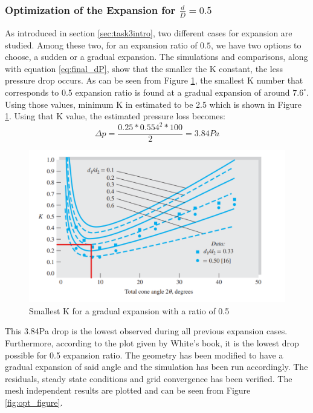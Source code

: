 \subsubsection{Optimization of the Expansion for $\frac{d}{D} = 0.5$}

As introduced in section \ref{sec:task3intro}, two different cases for expansion are studied. Among these two, for an expansion ratio of $0.5$, we have two options to choose, a sudden or a gradual expansion. The simulations and comparisons, along with equation \ref{eq:final_dP}, show that the smaller the K constant, the less pressure drop occurs. As can be seen from Figure \ref{fig:cone_angle}, the smallest K number that corresponds to 0.5 expansion ratio is found at a gradual expansion of around $7.6^{\circ}$. \\

\noindent Using those values, minimum K in estimated to be 2.5 which is shown in Figure \ref{fig:cone_angle}. Using that K value, the estimated pressure loss becomes:
\[\Delta p = \frac{0.25 * 0.554^2 * 100}{2} = 3.84Pa \]


\begin{figure}[H]
    \centering
    \includegraphics[width=.6\linewidth]{images/task3/cone_angle.png}
    \caption{Smallest K for a gradual expansion with a ratio of 0.5 \cite{white_chul_2016}}
    \label{fig:cone_angle}
\end{figure}


\noindent This 3.84Pa drop is the lowest observed during all previous expansion cases. Furthermore, according to the plot given by White's book, it is the lowest drop possible for 0.5 expansion ratio. The geometry has been modified to have a gradual expansion of said angle and the simulation has been run accordingly. The residuals, steady state conditions and grid convergence has been verified. The mesh independent results are plotted and can be seen from Figure \ref{fig:opt_figure}. 


